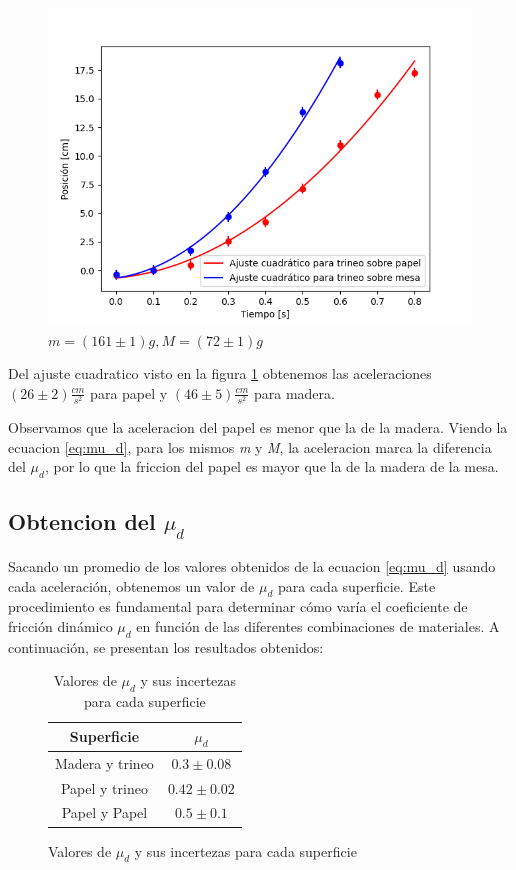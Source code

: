 \documentclass[12pt,a4]{article}
\begin{document}
\begin{figure}[H]
    \centering
    \includegraphics{ajuste2_PisoHojaM_OP.png}
    \caption{$m = (161 \pm 1) g, M = (72 \pm 1) g$}
    \label{fig:M_OP piso hoja}
\end{figure}

Del ajuste cuadratico visto en la figura \ref{fig:M_OP piso hoja} obtenemos las aceleraciones $(26 \pm 2) \frac{cm}{s^2}$ para papel y $(46 \pm 5) \frac{cm}{s^2}$ para madera.

Observamos que la aceleracion del papel es menor que la de la madera. Viendo la ecuacion \ref{eq:mu_d}, para los mismos \textit{m} y \textit{M}, la aceleracion marca la diferencia del $\mu_d$, por lo que la friccion del papel es mayor que la de la madera de la mesa.

\subsection{Obtencion del $\mu_d$}

Sacando un promedio de los valores obtenidos de la ecuacion \ref{eq:mu_d} usando cada aceleración, obtenemos un valor de $\mu_d$ para cada superficie. Este procedimiento es fundamental para determinar cómo varía el coeficiente de fricción dinámico $\mu_d$ en función de las diferentes combinaciones de materiales. A continuación, se presentan los resultados obtenidos:
\begin{figure}[H]
    \begin{table}[H]
        \centering
        \begin{tabular}{|c|c|}
            \hline
            \textbf{Superficie} & \textbf{$\mu_d$}\\
            \hline
            Madera y trineo & $0.3 \pm 0.08$\\
            Papel y trineo & $0.42 \pm 0.02$ \\
            Papel y Papel & $0.5 \pm 0.1$ \\
            \hline
        \end{tabular}
        \caption{Valores de $\mu_d$ y sus incertezas para cada superficie}
        \label{tab:mu_d}
    \end{table}
\end{figure}
\end{document}
